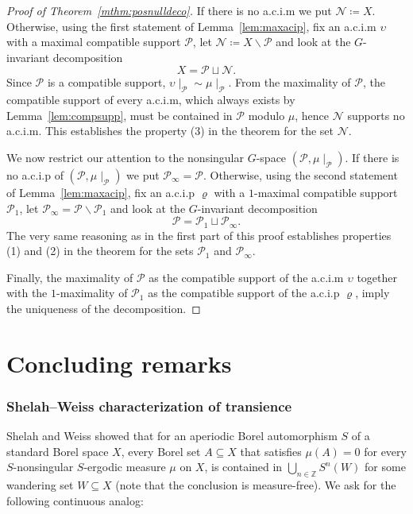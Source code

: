 \documentclass{amsart}
\numberwithin{equation}{subsection}
\begin{document}
\begin{proof}[Proof of Theorem~\ref{mthm:posnulldeco}]
If there is no {\sc a.c.i.m} we put \(\mathcal{N}\coloneqq X\). Otherwise, using the first statement of Lemma~\ref{lem:maxacip}, fix an {\sc a.c.i.m} \(\upsilon\) with a maximal compatible support \(\mathcal{P}\), let \(\mathcal{N}\coloneqq X\backslash\mathcal{P}\) and look at the \(G\)-invariant decomposition
\[X=\mathcal{P}\sqcup\mathcal{N}.\]
Since \(\mathcal{P}\) is a compatible support, \(\upsilon\mid_{\mathcal{P}}\sim\mu\mid_{\mathcal{P}}\). From the maximality of \(\mathcal{P}\), the compatible support of every {\sc a.c.i.m}, which always exists by Lemma~\ref{lem:compsupp}, must be contained in \(\mathcal{P}\) modulo \(\mu\), hence \(\mathcal{N}\) supports no {\sc a.c.i.m}. This establishes the property (3) in the theorem for the set \(\mathcal{N}\).

We now restrict our attention to the nonsingular \(G\)-space \(\left(\mathcal{P},\mu\mid_{\mathcal{P}}\right)\). If there is no {\sc a.c.i.p} of \(\left(\mathcal{P},\mu\mid_{\mathcal{P}}\right)\) we put \(\mathcal{P}_{\infty}=\mathcal{P}\). Otherwise, using the second statement of Lemma~\ref{lem:maxacip}, fix an {\sc a.c.i.p} \(\varrho\) with a \(1\)-maximal compatible support \(\mathcal{P}_{1}\), let \(\mathcal{P}_{\infty}=\mathcal{P}\backslash\mathcal{P}_{1}\) and look at the \(G\)-invariant decomposition
\[\mathcal{P}=\mathcal{P}_{1}\sqcup\mathcal{P}_{\infty}.\]
The very same reasoning as in the first part of this proof establishes properties (1) and (2) in the theorem for the sets \(\mathcal{P}_{1}\) and \(\mathcal{P}_{\infty}\).

Finally, the maximality of \(\mathcal{P}\) as the compatible support of the {\sc a.c.i.m} \(\upsilon\) together with the \(1\)-maximality of \(\mathcal{P}_{1}\) as the compatible support of the {\sc a.c.i.p} \(\varrho\), imply the uniqueness of the decomposition.
\end{proof}

\section{Concluding remarks}

\subsubsection{Shelah--Weiss characterization of transience}

Shelah and Weiss \cite{shelah1982measurable} showed that for an aperiodic Borel automorphism \(S\) of a standard Borel space \(X\), every Borel set \(A\subseteq X\) that satisfies \(\mu\left(A\right)=0\) for every \(S\)-nonsingular \(S\)-ergodic measure \(\mu\) on \(X\), is contained in \(\bigcup_{n\in\mathbb{Z}}S^{n}\left(W\right)\) for some wandering set \(W\subseteq X\) (note that the conclusion is measure-free). We ask for the following continuous analog:
\end{document}
